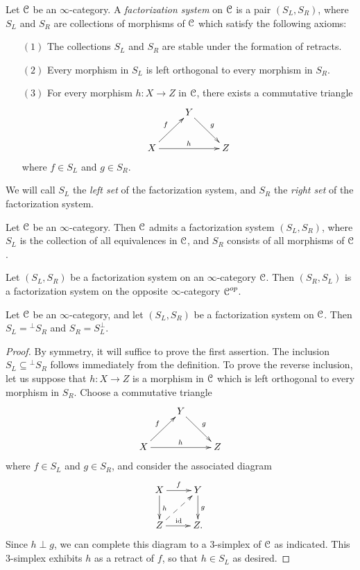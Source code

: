 \begin{definition}[Joyal]\label{spanhun}
Let $\operatorname{\mathcal{C}}$ be an $\infty$-category. A {\it factorization system} on $\operatorname{\mathcal{C}}$ is a pair
$(S_L, S_R)$, where $S_L$ and $S_R$ are collections of morphisms of $\operatorname{\mathcal{C}}$ which satisfy the following axioms:
\begin{itemize}
\item[$(1)$] The collections $S_L$ and $S_R$ are stable under the formation of retracts.
\item[$(2)$] Every morphism in $S_L$ is left orthogonal to every morphism in $S_R$.
\item[$(3)$] For every morphism $h: X \rightarrow Z$ in $\operatorname{\mathcal{C}}$, there exists a commutative
triangle
$$ \xymatrix{ & Y \ar[dr]^{g} & \\
X \ar[ur]^{f} \ar[rr]^{h} & & Z }$$
where $f \in S_L$ and $g \in S_R$. 
\end{itemize}
We will call $S_L$ the {\it left set} of the factorization system, and $S_R$ the
{\it right set} of the factorization system.
\end{definition}

\begin{example}\label{scumm}
Let $\operatorname{\mathcal{C}}$ be an $\infty$-category. Then $\operatorname{\mathcal{C}}$ admits a factorization system
$(S_L, S_R)$, where $S_L$ is the collection of all equivalences in $\operatorname{\mathcal{C}}$, and $S_R$ consists of all morphisms of $\operatorname{\mathcal{C}}$.
\end{example}

\begin{remark}\label{spill}
Let $(S_L, S_R)$ be a factorization system on an $\infty$-category $\operatorname{\mathcal{C}}$. Then
$(S_R, S_L)$ is a factorization system on the opposite $\infty$-category $\operatorname{\mathcal{C}}^{op}$. 
\end{remark}

\begin{proposition}\label{swin}
Let $\operatorname{\mathcal{C}}$ be an $\infty$-category, and let $(S_L, S_R)$ be a factorization system on $\operatorname{\mathcal{C}}$. 
Then $S_L = {^{\perp}S_R}$ and $S_R = S_L^{\perp}$.
\end{proposition}

\begin{proof}
By symmetry, it will suffice to prove the first assertion. The inclusion $S_L \subseteq {^{\perp}S_R}$ follows immediately from the definition. To prove the reverse inclusion, let us suppose that $h: X \rightarrow Z$ is a morphism in $\operatorname{\mathcal{C}}$ which is left orthogonal to every morphism in $S_R$. Choose a commutative triangle
$$ \xymatrix{ & Y \ar[dr]^{g} & \\
X \ar[ur]^{f} \ar[rr]^{h} & & Z }$$
where $f \in S_L$ and $g \in S_R$, and consider the associated diagram
$$ \xymatrix{ X \ar[r]^{f} \ar[d]^{h} & Y \ar[d]^{g} \\
Z \ar[r]^{\id} \ar@{-->}[ur] & Z. }$$
Since $h \perp g$, we can complete this diagram to a $3$-simplex of $\operatorname{\mathcal{C}}$ as indicated. This $3$-simplex exhibits $h$ as a retract of $f$, so that $h \in S_L$ as desired.
\end{proof}

